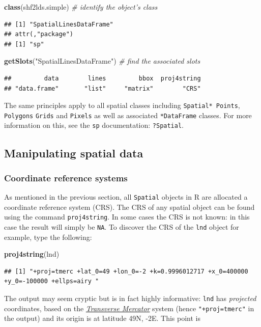 \documentclass[]{article}
\newenvironment{Shaded}{}{}
\newcommand{\KeywordTok}[1]{\textcolor[rgb]{0.00,0.44,0.13}{\textbf{{#1}}}}
\newcommand{\StringTok}[1]{\textcolor[rgb]{0.25,0.44,0.63}{{#1}}}
\newcommand{\CommentTok}[1]{\textcolor[rgb]{0.38,0.63,0.69}{\textit{{#1}}}}
\newcommand{\NormalTok}[1]{{#1}}
\begin{document}
\begin{Shaded}
\begin{Highlighting}[]
\KeywordTok{class}\NormalTok{(shf2lds.simple)  }\CommentTok{# identify the object's class}
\end{Highlighting}
\end{Shaded}
\begin{verbatim}
## [1] "SpatialLinesDataFrame"
## attr(,"package")
## [1] "sp"
\end{verbatim}
\begin{Shaded}
\begin{Highlighting}[]
\KeywordTok{getSlots}\NormalTok{(}\StringTok{"SpatialLinesDataFrame"}\NormalTok{)  }\CommentTok{# find the associated slots}
\end{Highlighting}
\end{Shaded}
\begin{verbatim}
##         data        lines         bbox  proj4string 
## "data.frame"       "list"     "matrix"        "CRS"
\end{verbatim}
The same principles apply to all spatial classes including
\texttt{Spatial* Points}, \texttt{Polygons} \texttt{Grids} and
\texttt{Pixels} as well as associated \texttt{*DataFrame} classes. For
more information on this, see the \texttt{sp} documentation:
\texttt{?Spatial}.

\subsection{Manipulating spatial data}

\subsubsection{Coordinate reference systems}

As mentioned in the previous section, all \texttt{Spatial} objects in R
are allocated a coordinate reference system (CRS). The CRS of any
spatial object can be found using the command \texttt{proj4string}. In
some cases the CRS is not known: in this case the result will simply be
\texttt{NA}. To discover the CRS of the \texttt{lnd} object for example,
type the following:

\begin{Shaded}
\begin{Highlighting}[]
\KeywordTok{proj4string}\NormalTok{(lnd)}
\end{Highlighting}
\end{Shaded}
\begin{verbatim}
## [1] "+proj=tmerc +lat_0=49 +lon_0=-2 +k=0.9996012717 +x_0=400000 +y_0=-100000 +ellps=airy "
\end{verbatim}
The output may seem cryptic but is in fact highly informative:
\texttt{lnd} has \emph{projected} coordinates, based on the
\href{http://en.wikipedia.org/wiki/Transverse\_Mercator\_projection}{\emph{Transverse
Mercator}} system (hence \texttt{"+proj=tmerc"} in the output) and its
origin is at latitude 49N, -2E. This point is
\end{document}
